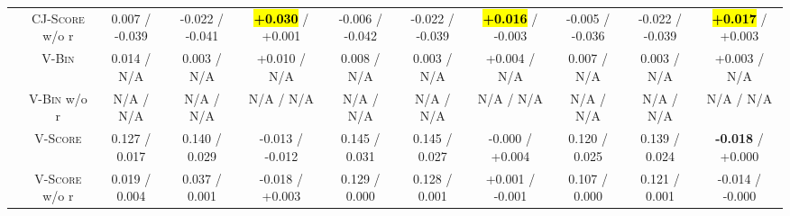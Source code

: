 \begin{table}[t]
\begin{tabular}{@{}c|c|ccc|ccc|ccc@{}}
                    & \textsc{CJ-Score} w/o r & 0.007 / -0.039  & -0.022 / -0.041 & \hl{\textbf{+0.030}} / +0.001               & -0.006 / -0.042 & -0.022 / -0.039 & \hl{\textbf{+0.016}} / -0.003               & -0.005 / -0.036 & -0.022 / -0.039 & \hl{\textbf{+0.017}} / +0.003               \\
        \cmidrule{2-11}
                    & \textsc{V-Bin}          & 0.014 / N/A     & 0.003 / N/A     & +0.010 / N/A                                & 0.008 / N/A     & 0.003 / N/A     & +0.004 / N/A                                & 0.007 / N/A     & 0.003 / N/A     & +0.003 / N/A                                \\
                    & \textsc{V-Bin} w/o r    & N/A / N/A       & N/A / N/A       & N/A / N/A                                   & N/A / N/A       & N/A / N/A       & N/A / N/A                                   & N/A / N/A       & N/A / N/A       & N/A / N/A                                   \\
                    & \textsc{V-Score}        & 0.127 / 0.017   & 0.140 / 0.029   & -0.013 / -0.012                             & 0.145 / 0.031   & 0.145 / 0.027   & -0.000 / +0.004                             & 0.120 / 0.025   & 0.139 / 0.024   & \textbf{-0.018} / +0.000                    \\
                    & \textsc{V-Score} w/o r  & 0.019 / 0.004   & 0.037 / 0.001   & -0.018 / +0.003                             & 0.129 / 0.000   & 0.128 / 0.001   & +0.001 / -0.001                             & 0.107 / 0.000   & 0.121 / 0.001   & -0.014 / -0.000                             \\
        \bottomrule
    \end{tabular}
\end{table}